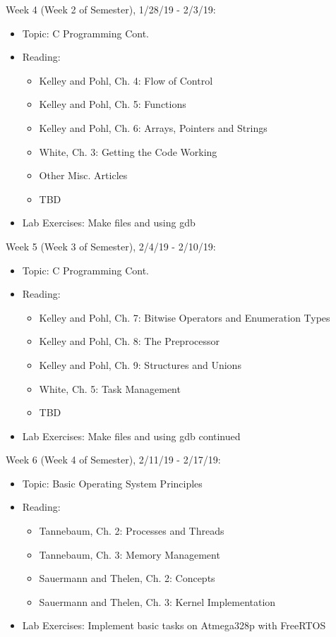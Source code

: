 \documentclass[12pt,a4paper,oneside,notitlepage]{article}
\begin{document}
Week 4 (Week 2 of Semester), 1/28/19 - 2/3/19:
\begin{itemize}
\item Topic: C Programming Cont.
\item Reading:
	\begin{itemize}
		\item Kelley and Pohl, Ch. 4: Flow of Control
		\item Kelley and Pohl, Ch. 5: Functions
		\item Kelley and Pohl, Ch. 6: Arrays, Pointers and Strings
		\item White, Ch. 3: Getting the Code Working
		\item Other Misc. Articles
		\item TBD
	\end{itemize}
\item Lab Exercises: Make files and using gdb
\end{itemize}
Week 5 (Week 3 of Semester), 2/4/19 - 2/10/19:
\begin{itemize}
\item Topic: C Programming Cont.
\item Reading:
	\begin{itemize}
		\item Kelley and Pohl, Ch. 7: Bitwise Operators and Enumeration Types
		\item Kelley and Pohl, Ch. 8: The Preprocessor
		\item Kelley and Pohl, Ch. 9: Structures and Unions
		\item White, Ch. 5: Task Management
		\item TBD
	\end{itemize}
\item Lab Exercises: Make files and using gdb continued
\end{itemize}

Week 6 (Week 4 of Semester), 2/11/19 - 2/17/19:
\begin{itemize}
\item Topic: Basic Operating System Principles
\item Reading:
	\begin{itemize}
		\item Tannebaum, Ch. 2: Processes and Threads
		\item Tannebaum, Ch. 3: Memory Management
		\item Sauermann and Thelen, Ch. 2: Concepts
		\item Sauermann and Thelen, Ch. 3: Kernel Implementation
	\end{itemize}
\item Lab Exercises: Implement basic tasks on Atmega328p with FreeRTOS
\end{itemize}
\end{document}
